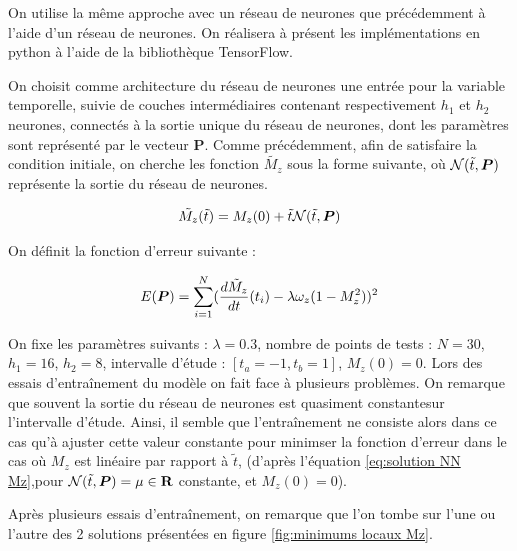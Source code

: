 \documentclass[12pt]{report}
\begin{document}
On utilise la même approche avec un réseau de neurones que précédemment à l'aide d'un réseau de neurones.
On réalisera à présent les implémentations en python à l'aide de la bibliothèque TensorFlow.

On choisit comme architecture du réseau de neurones une entrée pour la variable temporelle, suivie de couches intermédiaires contenant respectivement $h_1$ et $h_2$ neurones, connectés à la sortie unique du réseau de neurones, dont les paramètres sont représenté par le vecteur $\bm{P}$.
Comme précédemment, afin de satisfaire la condition initiale, on cherche les fonction $\tilde{M_z}$ sous la forme suivante, où ${\mathcal{N}}(\Tilde{t},\bm{P})$ représente la sortie du réseau de neurones.

\begin{equation}
    \Tilde{M_z}(\Tilde{t}) = M_z(0) +\Tilde{t} {\mathcal{N}}(\Tilde{t},\bm{P}) 
    \label{eq:solution NN Mz}
\end{equation}

On définit la fonction d'erreur suivante :

\begin{equation}
    E(\bm{P}) = \sum_{i=1}^{N} (\frac{d\Tilde{M}_z}{dt}(t_i) - \lambda\omega_z (1-M_z^2) )^2
\label{eq:erreur Mz}
\end{equation}

On fixe les paramètres suivants : $\lambda = 0.3$, nombre de points de tests : $N=30$, $h_1 = 16$, $h_2 = 8$, intervalle d'étude : $[t_a = -1, t_b = 1]$, $M_z(0) = 0$.
Lors des essais d'entraînement du modèle on fait face à plusieurs problèmes.
On remarque que souvent la sortie du réseau de neurones est quasiment constantesur l'intervalle d'étude. 
Ainsi, il semble que l'entraînement ne consiste alors dans ce cas qu'à ajuster cette valeur constante pour minimser la fonction d'erreur dans le cas où $M_z$ est linéaire par rapport à $\tilde{t}$, (d'après l'équation \ref{eq:solution NN Mz},pour ${\mathcal{N}}(\Tilde{t},\bm{P}) = \mu\in \mathbf{R}$ constante, et $M_z(0) = 0$).

Après plusieurs essais d'entraînement, on remarque que l'on tombe sur l'une ou l'autre des 2 solutions présentées en figure \ref{fig:minimums locaux Mz}.
\end{document}
